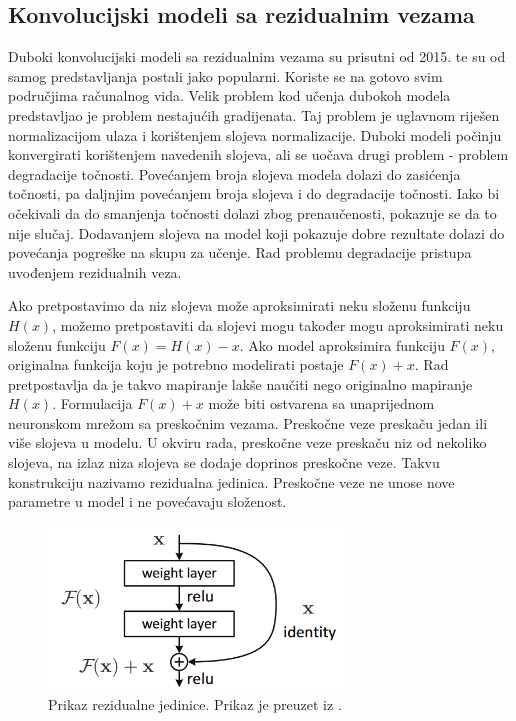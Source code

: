 \documentclass[times, utf8, diplomski,  numeric]{fer}
\begin{document}
\subsection{Konvolucijski modeli sa rezidualnim vezama}
Duboki konvolucijski modeli sa rezidualnim vezama su prisutni od 2015. te su od samog predstavljanja postali jako popularni. Koriste se na gotovo svim područjima računalnog vida. Velik problem kod učenja dubokoh modela predstavljao je problem nestajućih gradijenata. Taj problem je uglavnom riješen normalizacijom ulaza i korištenjem slojeva normalizacije. Duboki modeli počinju konvergirati korištenjem navedenih slojeva, ali se uočava drugi problem - problem degradacije točnosti. Povećanjem broja slojeva modela dolazi do zasićenja točnosti, pa daljnjim povećanjem broja slojeva i do degradacije točnosti. Iako bi očekivali da do smanjenja točnosti dolazi zbog prenaučenosti, pokazuje se da to nije slučaj. Dodavanjem slojeva na model koji pokazuje dobre rezultate dolazi do povećanja pogreške na skupu za učenje. Rad \cite{resnet} problemu degradacije pristupa uvođenjem rezidualnih veza. 
\par
Ako pretpostavimo da niz slojeva može aproksimirati neku složenu funkciju $H(x)$, možemo pretpostaviti da slojevi mogu također mogu aproksimirati neku složenu funkciju $F(x) = H(x) - x$. Ako model aproksimira funkciju $F(x)$, originalna funkcija koju je potrebno modelirati postaje $F(x) + x$. Rad \cite{resnet} pretpostavlja da je takvo mapiranje lakše naučiti nego originalno mapiranje $H(x)$. Formulacija $F(x) + x$ može biti ostvarena sa unaprijednom neuronskom mrežom sa preskočnim vezama. Preskočne veze preskaču jedan ili više slojeva u modelu. U okviru rada, preskočne veze preskaču  niz od nekoliko slojeva, na izlaz niza slojeva se dodaje doprinos preskočne veze. Takvu konstrukciju nazivamo rezidualna jedinica. Preskočne veze ne unose nove parametre u model i ne povećavaju složenost. 
\par
\begin{figure}[htb]
\centering
\includegraphics[width=8cm]{./images/residual_block}
\caption{Prikaz rezidualne jedinice. Prikaz je preuzet iz \cite{resnet}.}
\label{fig:resblock}
\end{figure}
\end{document}
